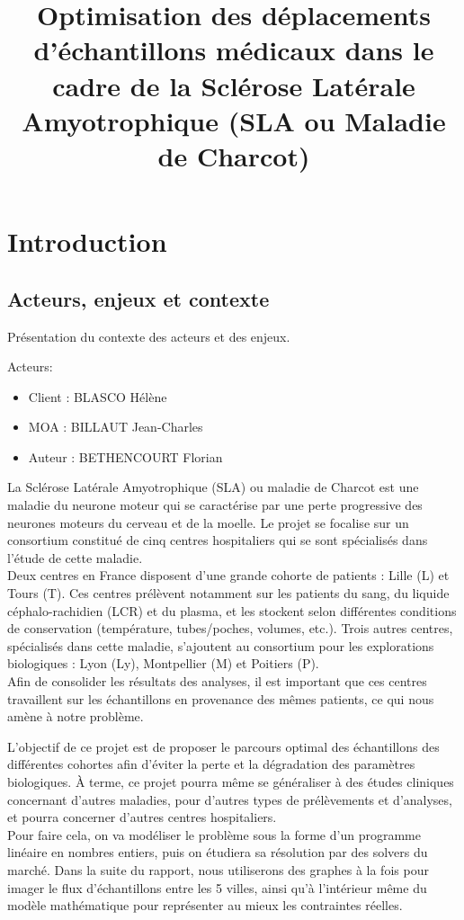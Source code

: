 \documentclass{polytech/polytech}
\title{Optimisation des déplacements d’échantillons médicaux dans le cadre de la Sclérose Latérale Amyotrophique
(SLA ou Maladie de Charcot)}
\numberwithin{figure}{chapter}
\begin{document}
             
\chapter{Introduction}
\section{Acteurs, enjeux et contexte}

Présentation du contexte des acteurs et des enjeux.

Acteurs:
\begin{itemize}
\item Client : BLASCO Hélène
\item MOA : BILLAUT Jean-Charles
\item Auteur : BETHENCOURT Florian\\
\end{itemize}

\begin{flushleft}
La Sclérose Latérale Amyotrophique (SLA) ou maladie de Charcot est une maladie du neurone moteur qui se caractérise par une perte progressive des neurones moteurs du cerveau et de la moelle.  Le projet se focalise sur un consortium constitué de cinq centres hospitaliers qui se sont spécialisés dans l’étude de cette maladie.\\
Deux centres en France disposent d’une grande cohorte de patients : Lille (L) et Tours (T). Ces centres prélèvent notamment sur les patients du sang, du liquide céphalo-rachidien (LCR) et du plasma, et les stockent selon différentes conditions de conservation (température, tubes/poches, volumes, etc.). Trois autres centres, spécialisés dans cette maladie, s’ajoutent au consortium pour les explorations biologiques : Lyon (Ly), Montpellier (M) et Poitiers (P).\\
Afin de consolider les résultats des analyses, il est important que ces centres travaillent sur les échantillons en provenance des mêmes patients, ce qui nous amène à notre problème.
\end{flushleft}

\begin{flushleft}
L’objectif de ce projet est de proposer le parcours optimal des échantillons des différentes
cohortes afin d’éviter la perte et la dégradation des paramètres biologiques. À terme, ce projet pourra même
se généraliser à des études cliniques concernant d’autres maladies, pour d’autres types de
prélèvements et d’analyses, et pourra concerner d’autres centres hospitaliers.\\
Pour faire cela, on va modéliser le problème sous la forme d’un programme linéaire en nombres entiers, puis on étudiera sa résolution par des solvers du marché. Dans la suite du rapport, nous utiliserons des graphes à la fois pour imager le flux d'échantillons entre les 5 villes, ainsi qu'à l'intérieur même du modèle mathématique pour représenter au mieux les contraintes réelles.
\end{flushleft}
\end{document}

